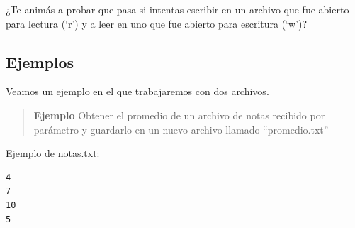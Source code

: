 \documentclass[
  letterpaper,
  DIV=11,
  numbers=noendperiod]{scrreprt}
\begin{document}
\begin{tcolorbox}[enhanced jigsaw, arc=.35mm, toptitle=1mm, colframe=quarto-callout-tip-color-frame, bottomtitle=1mm, opacitybacktitle=0.6, colbacktitle=quarto-callout-tip-color!10!white, leftrule=.75mm, coltitle=black, toprule=.15mm, titlerule=0mm, title=\textcolor{quarto-callout-tip-color}{\faLightbulb}\hspace{0.5em}{Tip}, bottomrule=.15mm, rightrule=.15mm, colback=white, breakable, opacityback=0, left=2mm]

¿Te animás a probar que pasa si intentas escribir en un archivo que fue
abierto para lectura (`r') y a leer en uno que fue abierto para
escritura (`w')?

\end{tcolorbox}

\subsection{Ejemplos}\label{ejemplos-1}

Veamos un ejemplo en el que trabajaremos con dos archivos.

\begin{quote}
\textbf{Ejemplo} Obtener el promedio de un archivo de notas recibido por
parámetro y guardarlo en un nuevo archivo llamado ``promedio.txt''
\end{quote}

Ejemplo de notas.txt:

\begin{verbatim}
4
7
10
5
\end{verbatim}
\end{document}
